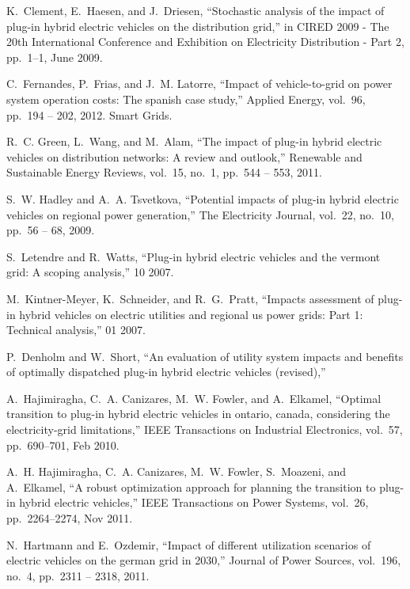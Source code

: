 K.~Clement, E.~Haesen, and J.~Driesen, ``Stochastic analysis of the impact of
  plug-in hybrid electric vehicles on the distribution grid,'' in CIRED
  2009 - The 20th International Conference and Exhibition on Electricity
  Distribution - Part 2, pp.~1--1, June 2009.

C.~Fernandes, P.~Frias, and J.~M. Latorre,
``Impact of vehicle-to-grid on power system operation costs: The spanish case study,'' 
Applied Energy, vol.~96, pp.~194 -- 202, 2012.
\newblock Smart Grids.

R.~C. Green, L.~Wang, and M.~Alam, ``The impact of plug-in hybrid electric
  vehicles on distribution networks: A review and outlook,'' Renewable and
  Sustainable Energy Reviews, vol.~15, no.~1, pp.~544 -- 553, 2011.

S.~W. Hadley and A.~A. Tsvetkova, ``Potential impacts of plug-in hybrid
  electric vehicles on regional power generation,'' The Electricity
  Journal, vol.~22, no.~10, pp.~56 -- 68, 2009.

S.~Letendre and R.~Watts, ``Plug-in hybrid electric vehicles and the vermont
  grid: A scoping analysis,'' 10 2007.

M.~Kintner-Meyer, K.~Schneider, and R.~G.~Pratt, ``Impacts assessment of
  plug-in hybrid vehicles on electric utilities and regional us power grids:
  Part 1: Technical analysis,'' 01 2007.

P.~Denholm and W.~Short, ``An evaluation of utility system impacts and benefits
  of optimally dispatched plug-in hybrid electric vehicles (revised),''

A.~Hajimiragha, C.~A. Canizares, M.~W. Fowler, and A.~Elkamel, ``Optimal
  transition to plug-in hybrid electric vehicles in ontario, canada,
  considering the electricity-grid limitations,'' IEEE Transactions on
  Industrial Electronics, vol.~57, pp.~690--701, Feb 2010.

A.~H. Hajimiragha, C.~A. Canizares, M.~W. Fowler, S.~Moazeni, and A.~Elkamel,
  ``A robust optimization approach for planning the transition to plug-in
  hybrid electric vehicles,'' IEEE Transactions on Power Systems,
  vol.~26, pp.~2264--2274, Nov 2011.

N.~Hartmann and E.~Ozdemir, ``Impact of different utilization scenarios of
  electric vehicles on the german grid in 2030,'' Journal of Power
  Sources, vol.~196, no.~4, pp.~2311 -- 2318, 2011.

